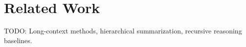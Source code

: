 \section{Related Work}

TODO: Long-context methods, hierarchical summarization, recursive reasoning baselines.

